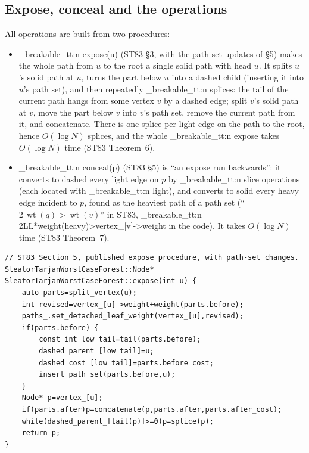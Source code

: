 \documentclass[11pt,a4paper,oneside]{report}
\theoremstyle{plain}
\theoremstyle{definition}
\theoremstyle{remark}
\DeclareRobustCommand{\code}[1]{\mtp_breakable_tt:n {#1}}
\DeclareRobustCommand{\file}[1]{\mtp_breakable_tt:n {#1}}
\newcommand{\wt}{\operatorname{wt}}
\begin{document}
\subsection{Expose, conceal and the operations}
All operations are built from two procedures:
\begin{itemize}
\item \code{expose(u)} (ST83 \S3, with the path-set updates of \S5) makes the whole path from
  \(u\) to the root a single solid path with head \(u\). It splits \(u\)'s solid path at \(u\),
  turns the part below \(u\) into a dashed child (inserting it into \(u\)'s path set), and then
  repeatedly \code{splice}s: the tail of the current path hangs from some vertex \(v\) by a
  dashed edge; split \(v\)'s solid path at \(v\), move the part below \(v\) into \(v\)'s path
  set, remove the current path from it, and concatenate. There is one splice per light edge on
  the path to the root, hence \(O(\log N)\) splices, and the whole \code{expose} takes
  \(O(\log N)\) time (ST83 Theorem~6).
\item \code{conceal(p)} (ST83 \S5) is ``an expose run backwards'': it converts to dashed every
  light edge on \(p\) by \code{slice} operations (each located with \code{light}), and converts
  to solid every heavy edge incident to \(p\), found as the heaviest path of a path set
  (``\(2\,\wt(q)>\wt(v)\)'' in ST83, \code{2LL*weight(heavy)>vertex_[v]->weight} in the code). It
  takes \(O(\log N)\) time (ST83 Theorem~7).
\end{itemize}

\begin{lstlisting}[style=cpp,firstnumber=297,caption={\file{src/worst_case_dynamic_tree.cpp}, lines 297--313: \code{expose}.},label={lst:expose}]
// ST83 Section 5, published expose procedure, with path-set changes.
SleatorTarjanWorstCaseForest::Node*
SleatorTarjanWorstCaseForest::expose(int u) {
    auto parts=split_vertex(u);
    int revised=vertex_[u]->weight+weight(parts.before);
    paths_.set_detached_leaf_weight(vertex_[u],revised);
    if(parts.before) {
        const int low_tail=tail(parts.before);
        dashed_parent_[low_tail]=u;
        dashed_cost_[low_tail]=parts.before_cost;
        insert_path_set(parts.before,u);
    }
    Node* p=vertex_[u];
    if(parts.after)p=concatenate(p,parts.after,parts.after_cost);
    while(dashed_parent_[tail(p)]>=0)p=splice(p);
    return p;
}
\end{lstlisting}
\end{document}
